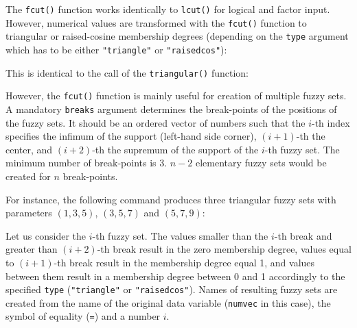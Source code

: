 \documentclass[review]{elsarticle}
\newcommand{\code}[1]{\texttt{#1}}
\begin{document}
The \code{fcut()} function works identically to \code{lcut()} for logical and factor input. However,
numerical values are transformed with the \code{fcut()} function to triangular or raised-cosine membership degrees (depending on the \code{type} argument which has to be either \code{"triangle"} or \code{"raisedcos"}):
%

%
This is identical to the call of the \code{triangular()} function:
%

%

However, the \code{fcut()} function is mainly useful for creation of multiple fuzzy sets. A mandatory \code{breaks} argument determines the break-points of the positions of the fuzzy sets. It should be an ordered vector of numbers such that the $i$-th index specifies the infimum of the support (left-hand side corner), $(i+1)$-th the center, and $(i+2)$-th the supremum of the support of the $i$-th fuzzy set. The minimum number of break-points is 3. $n-2$ elementary fuzzy sets would be created for $n$ break-points.

For instance, the following command produces three triangular fuzzy sets with parameters $(1, 3, 5)$, $(3, 5, 7)$ and $(5, 7, 9)$:
%

%

Let us consider the $i$-th fuzzy set. The values smaller than the $i$-th break and greater than $(i+2)$-th break result in the zero membership degree, values equal to $(i+1)$-th break result in the membership degree equal 1, and values between them result in a membership degree between 0 and 1 accordingly to the specified \code{type} (\code{"triangle"} or \code{"raisedcos"}).
Names of resulting fuzzy sets are created from the name of the original data variable (\code{numvec} in this case), the symbol of equality (\code{=}) and a number $i$.
\end{document}
